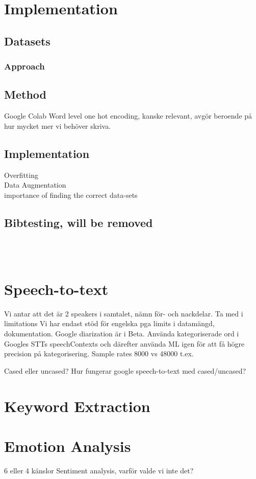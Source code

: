 \documentclass[nofilelist]{cslthse-msc}
\begin{document}
\chapter{Implementation}

\section{Datasets}

\subsection{Approach} 
\section{Method}
Google Colab
Word level one hot encoding, kanske relevant, avgör beroende på hur mycket mer vi behöver skriva.
\section{Implementation}
Overfitting \\
Data Augmentation \\
importance of finding the correct data-sets \\
\section{Bibtesting, will be removed}
\citep{emotionlinesdataset} \\
\citep{franoischollet2017learning}\\
\citep{beaver2020towards}
\chapter{Speech-to-text}
Vi antar att det är 2 speakers i samtalet, nämn för- och nackdelar. Ta med i limitations
Vi har endast stöd för engelska pga limits i datamängd, dokumentation. 
Google diarization är i Beta.
Använda kategoriserade ord i Googles STTs speechContexts och därefter använda ML igen för att få högre precision på kategorisering. 
Sample rates 8000 vs 48000 t.ex.

Cased eller uncased? Hur fungerar google speech-to-text med cased/uncased?

\chapter{Keyword Extraction}
\chapter{Emotion Analysis}
6 eller 4 känslor
Sentiment analysis, varför valde vi inte det?
\end{document}

